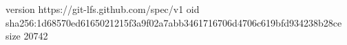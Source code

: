 version https://git-lfs.github.com/spec/v1
oid sha256:1d68570ed6165021215f3a9f02a7abb3461716706d4706c619bfd934238b28ce
size 20742
